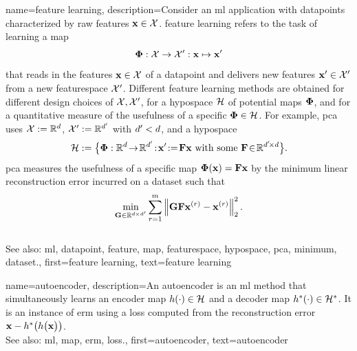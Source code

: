 {name={feature learning},
	description={Consider an \gls{ml} application with \glspl{datapoint} characterized by 
		raw \glspl{feature} ${\bf x} \in \mathcal{X}$. \Gls{feature} learning 
		refers to the task of learning a \gls{map} 
		$${\bf \Phi}: \mathcal{X} \rightarrow \mathcal{X}': {\bf x} \mapsto {\bf x}'$$ 
		that reads in the \glspl{feature} ${\bf x} \in \mathcal{X}$ of a \gls{datapoint} and delivers new 
		\glspl{feature} ${\bf x}' \in \mathcal{X}'$ from a new \gls{featurespace} $\mathcal{X}'$. 
		Different \gls{feature} learning methods are obtained for different design 
		choices of $\mathcal{X},\mathcal{X}'$, for a \gls{hypospace} $\mathcal{H}$ 
		of potential \glspl{map} ${\bf \Phi}$, and for a quantitative measure of the usefulness of 
		a specific ${\bf \Phi} \in \mathcal{H}$. For example, \gls{pca} 
		uses $\mathcal{X} := \mathbb{R}^{d}$, $\mathcal{X}' := \mathbb{R}^{d'}$ 
		with $d' < d$, and a \gls{hypospace} 
		$$\hypospace\defeq \big\{ \featuremapvec: \mathbb{R}^{\dimlocalmodel}
		\!\rightarrow\! \mathbb{R}^{\dimlocalmodel'}\!:\!\featurevec'\!\defeq\!\mF \featurevec \mbox{ with some } \mF \!\in\! \mathbb{R}^{\dimlocalmodel' \!\times \dimlocalmodel} \big\}.$$ \Gls{pca} measures the usefulness of a specific \gls{map} ${\bf \Phi}({\bf x})= \mathbf{F} {\bf x}$ 
	by the \gls{minimum} linear reconstruction error incurred on a \gls{dataset} such that 
$$\min_{\mG \in \mathbb{R}^{\dimlocalmodel \!\!\!\times \dimlocalmodel'}} \sum_{\sampleidx=1}^{\samplesize} \normgeneric{\mG \mF \featurevec^{(\sampleidx)} - \featurevec^{(\sampleidx)}}{2}^{2}.$$ 
			\\ 
		See also: \gls{ml}, \gls{datapoint}, \gls{feature}, \gls{map}, \gls{featurespace}, \gls{hypospace}, \gls{pca}, \gls{minimum}, \gls{dataset}.}, 
	first={feature learning},
	text={feature learning}
} 

{name={autoencoder},
	description={An autoencoder is an \gls{ml} method that simultaneously learns an encoder \gls{map} 
		$h(\cdot) \in \mathcal{H}$ and a decoder \gls{map} $h^{*}(\cdot) \in \mathcal{H}^{*}$. 
		It is an instance of \gls{erm} using a \gls{loss} computed from the reconstruction error 
		${\bf x} - h^{*}\big(  h \big( {\bf x} \big) \big)$.
					\\ 
		See also: \gls{ml}, \gls{map}, \gls{erm}, \gls{loss}.},
	first={autoencoder},
	text={autoencoder}
} 

